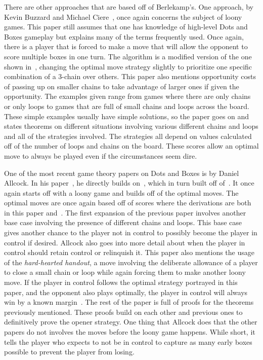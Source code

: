 \documentclass[12pt]{article}
\begin{document}
    There are other approaches that are based off of Berlekamp's. One approach, by Kevin Buzzard and Michael Ciere~\cite{buzzard2014}, once again concerns the subject of loony games. This paper still assumes that one has knowledge of high-level Dots and Boxes gameplay but explains many of the terms frequently used. Once again, there is a player that is forced to make a move that will allow the opponent to score multiple boxes in one turn. The algorithm is a modified version of the one shown in~\cite{berlekamp2000}, changing the optimal move strategy slightly to prioritize one specific combination of a 3-chain over others. This paper also mentions opportunity costs of passing up on smaller chains to take advantage of larger ones if given the opportunity. The examples given range from games where there are only chains or only loops to games that are full of small chains and loops across the board. These simple examples usually have simple solutions, so the paper goes on and states theorems on different situations involving various different chains and loops and all of the strategies involved. The strategies all depend on values calculated off of the number of loops and chains on the board. These scores allow an optimal move to always be played even if the circumstances seem dire.

    One of the most recent game theory papers on Dots and Boxes is by Daniel Allcock. In his paper~\cite{allcock2019best}, he directly builds on~\cite{buzzard2014}, which in turn built off of~\cite{berlekamp2000}. It once again starts off with a loony game and builds off of the optimal moves. The optimal moves are once again based off of scores where the derivations are both in this paper and~\cite{buzzard2014}. The first expansion of the previous paper involves another base case involving the presence of different chains and loops. This base case gives another chance to the player not in control to possibly become the player in control if desired. Allcock also goes into more detail about when the player in control should retain control or relinquish it. This paper also mentions the usage of the \emph{hard-hearted handout}, a move involving the deliberate allowance of a player to close a small chain or loop while again forcing them to make another loony move. If the player in control follows the optimal strategy portrayed in this paper, and the opponent also plays optimally, the player in control will always win by a known margin~\cite{allcock2019best}. The rest of the paper is full of proofs for the theorems previously mentioned. These proofs build on each other and previous ones to definitively prove the opener strategy. One thing that Allcock does that the other papers do not involves the moves before the loony game happens. While short, it tells the player who expects to not be in control to capture as many early boxes possible to prevent the player from losing.

    
    
\end{document}
